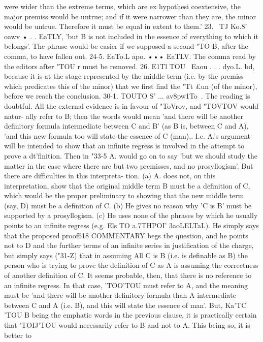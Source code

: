 {{{{{{{{{{{{{{{{{{{{{{{{were wider than the extreme terms, which are ex hypothesi
coextensive, the major premiss would be untrue; and if it were
narrower than they are, the minor would be untrue. Therefore
it must be equal in extent to them.'
23. ~TJ Ko.8' oawv • . . EaTLY, 'but B is not included in the
essence of everything to which it belongs'. The phrase would be
easier if we supposed a second "TO B, after the comma, to have
fallen out.
24-5. EaTo.L apo. ••• EaTLV. The comma read by the editors
after "TOU r must be removed.
26. E1Tl TOU ~Eaou . . . dyo.L. bd, because it is at the stage
represented by the middle term (i.e. by the premiss which
predicates this of the minor) that we first find the "Tt £un (of the
minor), before we reach the conclusion.
30-1. TOUTO S' ... av8pw1To~. The reading is doubtful. All the
external evidence is in favour of "ToVrov, and "TOVTOV would natur-
ally refer to B; then the words would mean 'and there will be
another definitory formula intermediate between C and B' (as
B is, between C and A), 'and this new formula too will state the
essence of C (man),. I.e. A.'s argument will be intended to
show that an infinite regress is involved in the attempt to prove
a dt'finition. Then in "33-5 A. would go on to say 'but we should
study the matter in the case where there are but two premisses,
and no prosyllogism'. But there are difficulties in this interpreta-
tion. (a) A. does not, on this interpretation, show that the
original middle term B must be a definition of C, which would be
the proper preliminary to showing that the new middle term
(say, D) must be a definition of C. (b) He gives no reason why 'C
is B' must be supported by a prosyllogism. (c) He uses none of
the phrases by which he usually points to an infinite regress (e.g.
Els TO a.7THPOI' {3aoLELTaL). He simply says that the proposed proof618
COMMENTARY
begs the question, and he points not to D and the further terms
of an infinite series in justification of the charge, but simply says
("31-Z) that in assuming All C is B (i.e. is definable as B) the
person who is trying to prove the definition of C as A is assuming
the correctness of another definition of C.
It seems probable, then, that there is no reference to an infinite
regress. In that case, 'TOO'TOU must refer to A, and the meaning
must be 'and there will be another definitory formula than A
intermediate between C and A (i.e. B), and this will state the
essence of man'. But, Ka'TC~ 'TOU B being the emphatic words in
the previous clause, it is practically certain that 'TOIJ'TOU would
necessarily refer to B and not to A. This being so, it is better to
}}}}}}}}}}}}}}}}}}}}}}}}}
